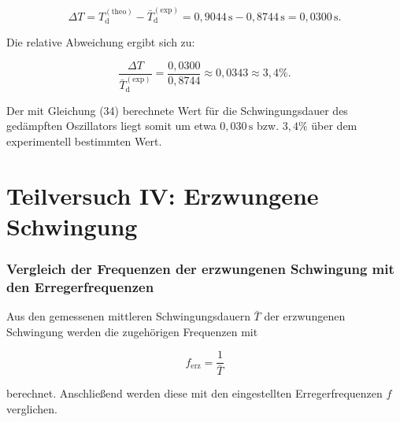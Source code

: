 \documentclass{report}
\begin{document}
\[
\Delta T = T_\mathrm{d}^{(\mathrm{theo})} - \bar{T}_\mathrm{d}^{(\mathrm{exp})}
= 0{,}9044\,\mathrm{s} - 0{,}8744\,\mathrm{s}
= 0{,}0300\,\mathrm{s}.
\]

Die relative Abweichung ergibt sich zu:

\[
\frac{\Delta T}{\bar{T}_\mathrm{d}^{(\mathrm{exp})}}
=
\frac{0{,}0300}{0{,}8744}
\approx 0{,}0343
\approx 3{,}4\%.
\]

Der mit Gleichung (34) berechnete Wert für die Schwingungsdauer des gedämpften Oszillators liegt somit um etwa $0{,}030\,\mathrm{s}$ bzw. $3{,}4\%$ über dem experimentell bestimmten Wert.



\newpage
\section{Teilversuch IV: Erzwungene Schwingung}
\subsubsection*{Vergleich der Frequenzen der erzwungenen Schwingung mit den Erregerfrequenzen}

Aus den gemessenen mittleren Schwingungsdauern $\bar T$ der erzwungenen Schwingung werden die zugehörigen Frequenzen mit

\[
f_\mathrm{erz}=\frac{1}{\bar T}
\]

berechnet. Anschließend werden diese mit den eingestellten Erregerfrequenzen $f$ verglichen.
\end{document}
